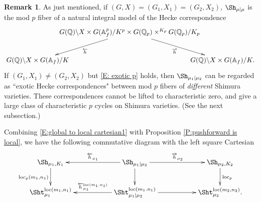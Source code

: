 \documentclass[11pt]{amsart}
\theoremstyle{definition}
\theoremstyle{definition}
\newtheorem{rmk}[thm]{Remark}
\theoremstyle{definition}
\numberwithin{equation}{subsection}
\newcommand{\bA}{{\mathbb A}}
\newcommand{\bQ}{{\mathbb Q}}
\newcommand{\loc}{\mathrm{loc}}
\begin{document}
\begin{rmk}
As just mentioned, if $(G,X)=(G_1,X_1)=(G_2,X_2)$, $\Sh_{\mu\mid\mu}$ is the mod $p$ fiber of a natural integral model of the Hecke correspondence
\begin{equation*}
\label{E: pHecke corr}
\xymatrix@C=-20pt{
&G(\bQ)\backslash X\times G(\bA_f^p)/K^p\times G(\bQ_p)\times^{K_p}G(\bQ_p)/K_p\ar^{\overleftarrow{h}}[ld]\ar_{\overrightarrow{h}}[rd]&\\
G(\bQ)\backslash X\times G(\bA_f)/K && G(\bQ)\backslash X\times G(\bA_f)/K.}
\end{equation*}
If $(G_1,X_1)\neq (G_2,X_2)$ but \eqref{E: exotic p} holds, then $\Sh_{\mu_1\mid \mu_2}$ can be regarded as ``exotic Hecke correspondences" between mod $p$ fibers of \emph{different} Shimura varieties. These correspondences cannot be lifted to characteristic zero, and give a large class of characteristic $p$ cycles on Shimura varieties. (See the next subsection.) 
\end{rmk}




Combining \eqref{E:global to local cartesian1} with Proposition \ref{P:pushforward is local}, we have the following commutative diagram with the left square Cartesian
\[
\xymatrix{
\Sh_{\mu_1,K_1} \ar_{\loc_p(m_1,n_1)}[d] && \ar_{\overleftarrow{h}_{\mu_1}}[ll] \Sh_{\mu_1|\mu_2} \ar^{\overrightarrow{h}_{\mu_2}}[rr] \ar[d] && \Sh_{\mu_2,K_2} \ar^{\loc_p}[d] \\
\Sht_{\mu_1}^{\loc(m_1,n_1)} && \ar_{\overleftarrow{h}_{\mu_1}^{\loc(m_1,n_1)}}[ll] \Sht_{\mu_1|\mu_2}^{\loc(m_1.n_1)} \ar[rr]&& \Sht_{\mu_2}^{\loc(m_2,n_2)}.
}
\]
\end{document}
